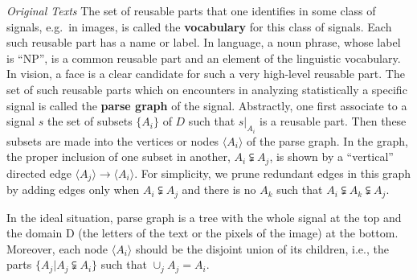 \documentclass[../Notes_of_CaRiVaC.tex]{subfiles}
\begin{document}
\begin{textbox}{\textit{Original Texts}}
The set of reusable parts that one identifies in some class of signals, e.g.\
in images, is called the \textbf{vocabulary} for this class of signals. Each
such reusable part has a name or label. In language, a noun phrase, whose label
is ``NP'', is a common reusable part and an element of the linguistic
vocabulary. In vision, a face is a clear candidate for such a very high-level
reusable part. The set of such reusable parts which on encounters  in analyzing
statistically a specific signal is called the \textbf{parse graph} of the
signal. Abstractly, one first associate to a signal $s$ the set of subsets
$\{A_i\}$ of $D$ such that $s\vert_{A_i}$ is a reusable part. Then these
subsets are made into the vertices or nodes $\langle A_i \rangle$ of the parse
graph. In the graph, the proper inclusion of one subset in another,
$A_i \subsetneqq A_j$, is shown by a ``vertical'' directed edge
$\langle A_j \rangle \to \langle A_i \rangle$. For simplicity, we prune
redundant edges in this graph by adding edges only when $A_i \subsetneqq A_j$
and there is no $A_k$ such that $A_i \subsetneqq A_k \subsetneqq A_j$.

\par
In the ideal situation, parse graph is a tree with the whole signal at the
top and the domain D (the letters of the text or the pixels of the image) at
the bottom. Moreover, each node $\langle A_i \rangle$ should be the disjoint
union of its children, i.e., the parts $\{A_j \vert A_j \subsetneqq A_i\}$
such that $\cup_j A_j = A_i$.
\end{textbox}
\end{document}
